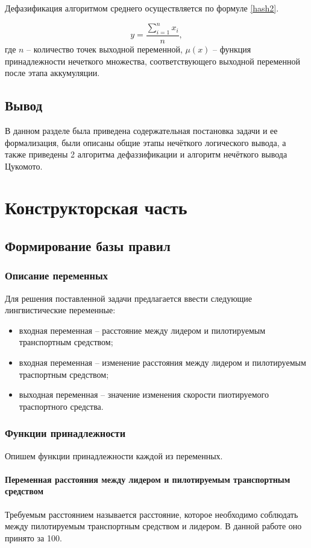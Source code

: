 \documentclass[12pt]{report}
\begin{document}
Дефазификация алгоритмом среднего осуществляется по формуле \ref{hash2}.

\begin{equation}
	\label{hash2}
	y = \frac{\sum_{i = 1}^{n}x_i}{n} ,
\end{equation}
где $n$ -- количество точек выходной переменной, $\mu(x)$ -- функция принадлежности нечеткого множества, соответствующего выходной переменной после этапа аккумуляции.



\section*{Вывод}
В данном разделе была приведена содержательная постановка задачи и ее формализация, были описаны общие этапы нечёткого логического вывода, а также приведены 2 алгоритма дефаззификации и алгоритм нечёткого вывода Цукомото.
\clearpage

\chapter{Конструкторская часть}
\section{Формирование базы правил}
\subsection{Описание переменных}
Для решения поставленной задачи предлагается ввести следующие лингвистические переменные:
\begin{itemize}
    \item входная переменная -- расстояние между лидером и пилотируемым транспортным средством;
    \item входная переменная -- изменение расстояния между лидером и пилотируемым траспортным средством;
    \item выходная переменная -- значение изменения скорости пиотируемого траспортного средства.
\end{itemize}

\subsection{Функции принадлежности}
Опишем функции принадлежности каждой из переменных.

\subsubsection{Переменная расстояния между лидером и пилотируемым транспортным средством}
Требуемым расстоянием называется расстояние, которое необходимо соблюдать между пилотируемым транспортным средством и лидером. В данной работе оно принято за 100. 
\end{document}
